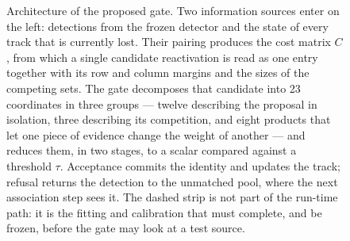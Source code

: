 \begin{figure}[t]
\caption{Architecture of the proposed gate. Two information sources enter on the
left: detections from the frozen detector and the state of every track that is
currently lost. Their pairing produces the cost matrix $C$, from which a single
candidate reactivation is read as one entry together with its row and column
margins and the sizes of the competing sets. The gate decomposes that candidate
into 23 coordinates in three groups --- twelve describing the proposal in
isolation, three describing its competition, and eight products that let one
piece of evidence change the weight of another --- and reduces them, in two
stages, to a scalar compared against a threshold $\tau$. Acceptance commits the
identity and updates the track; refusal returns the detection to the unmatched
pool, where the next association step sees it. The dashed strip is not part of
the run-time path: it is the fitting and calibration that must complete, and be
frozen, before the gate may look at a test source.}
\label{fig:framework}
\end{figure}
